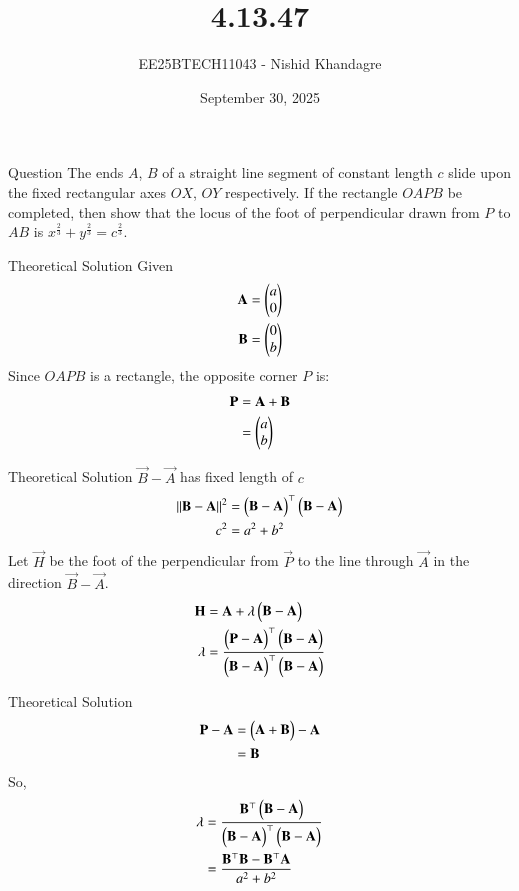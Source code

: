 \documentclass{beamer}
\title
{4.13.47}
\date{September 30, 2025}
\author
{EE25BTECH11043 - Nishid Khandagre}
\begin{document}
\frame{\titlepage}

\begin{frame}{Question}
The ends $A$, $B$ of a straight line segment of constant length $c$ slide upon the fixed rectangular axes $OX$, $OY$ respectively. If the rectangle $OAPB$ be completed, then show that the locus of the foot of perpendicular drawn from $P$ to $AB$ is $x^{\frac{2}{3}} + y^{\frac{2}{3}} = c^{\frac{2}{3}}$.
\end{frame}

\begin{frame}{Theoretical Solution}
Given
\begin{align}
\mathbf{A} &= \begin{pmatrix}a\\0\end{pmatrix} \\
\mathbf{B} &= \begin{pmatrix}0\\b\end{pmatrix}
\end{align}
Since $OAPB$ is a rectangle, the opposite corner $P$ is:
\begin{align}
\mathbf{P} &= \mathbf{A} + \mathbf{B} \\
&= \begin{pmatrix}a \\ b\end{pmatrix}
\end{align}
\end{frame}

\begin{frame}{Theoretical Solution}
$\vec{B}-\vec{A}$ has fixed length of $c$
\begin{align}
\left\lVert\mathbf{B}-\mathbf{A}\right\rVert^2 &= \begin{pmatrix}\mathbf{B}-\mathbf{A}\end{pmatrix}^\top\begin{pmatrix}\mathbf{B}-\mathbf{A}\end{pmatrix} \\
c^2&= a^2+b^2
\end{align}
Let $\vec{H}$ be the foot of the perpendicular from $\vec{P}$ to the line through $\vec{A}$ in the direction $\vec{B}-\vec{A}$.
\begin{align}
\mathbf{H} &= \mathbf{A} + \lambda\begin{pmatrix}\mathbf{B}-\mathbf{A}\end{pmatrix} \\
\lambda &= \frac{\begin{pmatrix}\mathbf{P}-\mathbf{A}\end{pmatrix}^\top\begin{pmatrix}\mathbf{B}-\mathbf{A}\end{pmatrix}}{\begin{pmatrix}\mathbf{B}-\mathbf{A}\end{pmatrix}^\top\begin{pmatrix}\mathbf{B}-\mathbf{A}\end{pmatrix}}
\end{align}
\end{frame}

\begin{frame}{Theoretical Solution}
\begin{align}
\mathbf{P}-\mathbf{A} &= \begin{pmatrix}\mathbf{A}+\mathbf{B}\end{pmatrix}-\mathbf{A} \\
&= \mathbf{B}
\end{align}
So,
\begin{align}
\lambda &= \frac{\mathbf{B}^\top\begin{pmatrix}\mathbf{B}-\mathbf{A}\end{pmatrix}}{\begin{pmatrix}\mathbf{B}-\mathbf{A}\end{pmatrix}^\top\begin{pmatrix}\mathbf{B}-\mathbf{A}\end{pmatrix}} \\
&= \frac{\mathbf{B}^\top\mathbf{B}-\mathbf{B}^\top\mathbf{A}}{a^2+b^2}
\end{align}
\end{frame}
\end{document}
